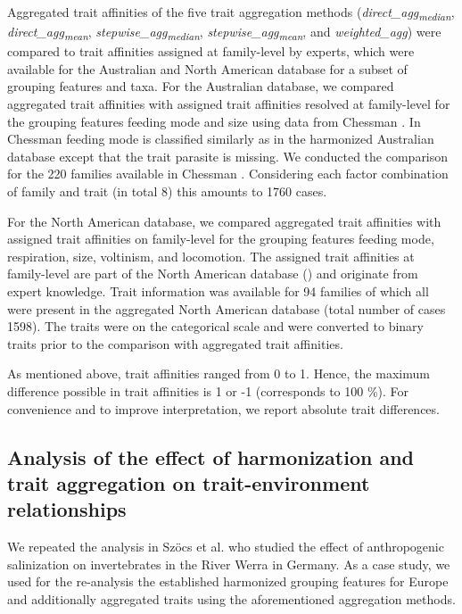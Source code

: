 \documentclass{article}
\begin{document}
Aggregated trait affinities of the five trait aggregation methods (\textit{direct\_agg\textsubscript{median}}, \textit{direct\_agg\textsubscript{mean}}, \textit{stepwise\_agg\textsubscript{median}}, \textit{stepwise\_agg\textsubscript{mean}}, and \textit{weighted\_agg}) were compared to trait affinities assigned at family-level by experts, which were available for the Australian and North American database for a subset of grouping features and taxa. For the Australian database, we compared aggregated trait affinities with assigned trait affinities resolved at family-level for the grouping features feeding mode and size using data from Chessman \cite{chessman_dissolved-oxygen_2018}. In Chessman \cite{chessman_dissolved-oxygen_2018} feeding mode is classified similarly as in the harmonized Australian database except that the trait parasite is missing. We conducted the comparison for the 220 families available in Chessman \cite{chessman_dissolved-oxygen_2018}. Considering each factor combination of family and trait (in total 8) this amounts to 1760 cases.

For the North American database, we compared aggregated trait affinities with assigned trait affinities on family-level for the grouping features feeding mode, respiration, size, voltinism, and locomotion. The assigned trait affinities at family-level are part of the North American database (\cite{twardochleb_trait_data_2020}) and originate from expert knowledge. Trait information was available for 94 families of which all were present in the aggregated North American database (total number of cases 1598). The traits were on the categorical scale and were converted to binary traits prior to the comparison with aggregated trait affinities.

As mentioned above, trait affinities ranged from 0 to 1. Hence, the maximum difference possible in trait affinities is 1 or -1 (corresponds to 100 \%). For convenience and to improve interpretation, we report absolute trait differences.


\subsection*{Analysis of the effect of harmonization and trait aggregation on trait-environment relationships}

We repeated the analysis in Szöcs et al. \cite{szocs_effects_2014} who studied the effect of anthropogenic salinization on invertebrates in the River Werra in Germany. As a case study, we used for the re-analysis the established harmonized grouping features for Europe and additionally aggregated traits using the aforementioned aggregation methods. 
\end{document}
